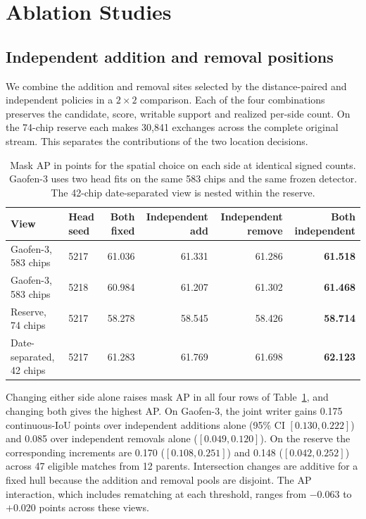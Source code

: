 \section{Ablation Studies}
\label{sec:ablation}

\subsection{Independent addition and removal positions}

We combine the addition and removal sites selected by the distance-paired and independent policies in a \(2\times2\) comparison. Each of the four combinations preserves the candidate, score, writable support and realized per-side count. On the 74-chip reserve each makes 30,841 exchanges across the complete original stream. This separates the contributions of the two location decisions.

\begin{table}[t]
\centering
\caption{Mask AP in points for the spatial choice on each side at identical signed counts. Gaofen-3 uses two head fits on the same 583 chips and the same frozen detector. The 42-chip date-separated view is nested within the reserve.}
\label{tab:signed-side-ablation}
\footnotesize
\begin{tabular}{@{}llrrrr@{}}
\toprule
View & Head seed & Both fixed & Independent add & Independent remove & Both independent\\
\midrule
Gaofen-3, 583 chips & 5217 & 61.036 & 61.331 & 61.286 & \textbf{61.518}\\
Gaofen-3, 583 chips & 5218 & 60.984 & 61.207 & 61.302 & \textbf{61.468}\\
Reserve, 74 chips & 5217 & 58.278 & 58.545 & 58.426 & \textbf{58.714}\\
Date-separated, 42 chips & 5217 & 61.283 & 61.769 & 61.698 & \textbf{62.123}\\
\bottomrule
\end{tabular}
\end{table}

Changing either side alone raises mask AP in all four rows of Table~\ref{tab:signed-side-ablation}, and changing both gives the highest AP. On Gaofen-3, the joint writer gains 0.175 continuous-IoU points over independent additions alone (95\% CI \([0.130,0.222]\)) and 0.085 over independent removals alone (\([0.049,0.120]\)). On the reserve the corresponding increments are 0.170 (\([0.108,0.251]\)) and 0.148 (\([0.042,0.252]\)) across 47 eligible matches from 12 parents. Intersection changes are additive for a fixed hull because the addition and removal pools are disjoint. The AP interaction, which includes rematching at each threshold, ranges from \(-0.063\) to \(+0.020\) points across these views.

